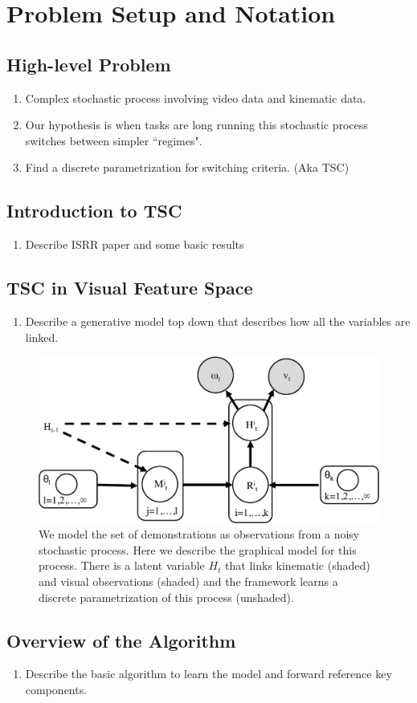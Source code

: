 \section{Problem Setup and Notation}

\subsection{High-level Problem}
\begin{enumerate}
\item Complex stochastic process involving video data and kinematic data.
\item Our hypothesis is when tasks are long running this stochastic process switches between simpler ``regimes".
\item Find a discrete parametrization for switching criteria. (Aka TSC)
\end{enumerate}

\subsection{Introduction to TSC}
\begin{enumerate}
\item Describe ISRR paper and some basic results
\end{enumerate}

\subsection{TSC in Visual Feature Space}

\begin{enumerate}
\item Describe a generative model top down that describes how all the variables are linked.
\end{enumerate}

\begin{figure}
\centering
\includegraphics[width=\columnwidth]{figures/probabilistic_graphical_model.pdf}
\caption{We model the set of demonstrations as observations from a noisy stochastic process. Here we describe the graphical model for this process. There is a latent variable $H_t$ that links kinematic (shaded) and visual observations (shaded) and the \sys framework learns a discrete parametrization of this process (unshaded). }
\label{fig:pgm}
\end{figure}

\subsection{Overview of the Algorithm}
\begin{enumerate}
\item Describe the basic algorithm to learn the model and forward reference key components.
\end{enumerate}